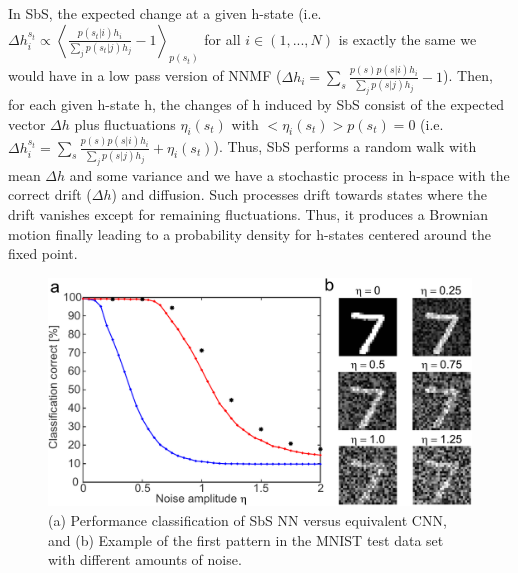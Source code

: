 In SbS, the expected change at a
given h-state (i.e. $\Delta h^{s_t}_i 	\propto \left<
\frac{p(s_t | i) h_i}{\sum_j p(s_t | j) h_j} - 1 \right>_{p(s_t)}$ for all
$i \in (1,...,N)$ is exactly the same we would have in a low pass
version of NNMF ($\Delta h_i
= \sum_s \frac{p(s) p(s | i) h_i}{\sum_j p(s | j) h_j} - 1$). Then,
for each given h-state h, the changes of h induced by SbS consist of the
expected vector $\Delta h$ plus fluctuations $\eta_i(s_t)$ with
$<\eta_i(s_t)>p(s_t) = 0$
(i.e. $\Delta h^{s_t}_i = \sum_s \frac{p(s) p(s | i) h_i}{\sum_j p(s | j) h_j} + \eta_i(s_t)$).
Thus, SbS performs a random walk with mean $\Delta h$ and some variance and we have a stochastic process in h-space with the correct
drift ($\Delta h$) and diffusion. Such processes drift towards states where the drift vanishes except for
remaining fluctuations. Thus, it produces a Brownian motion
finally leading to a probability density for h-states centered around
the fixed point.



\begin{figure}
  \includegraphics[width=\columnwidth]{../figures/sbs_robustnes.pdf}
  \caption{(a) Performance classification of SbS NN versus equivalent CNN, and (b) Example of the first pattern in the MNIST test data set with different amounts of noise.}
  \label{fig:robustnes_sbs}
\end{figure}


